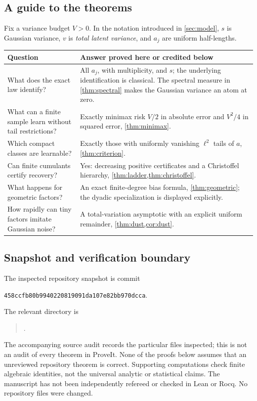 \documentclass[11pt,letterpaper]{article}
\numberwithin{equation}{section}
\theoremstyle{definition}
\theoremstyle{remark}
\newcommand{\pin}{458ccfb80b9940220819091da107e82bb970dcca}
\begin{document}
\subsection{A guide to the theorems}
Fix a variance budget $V>0$. In the notation introduced in \cref{sec:model},
$s$ is Gaussian variance, $v$ is \emph{total latent variance}, and $a_j$ are
uniform half-lengths.
\begin{center}
\begin{tabularx}{\textwidth}{@{}p{}X@{}}
\toprule
Question & Answer proved here or credited below \\\midrule
What does the exact law identify? & All $a_j$, with multiplicity, and $s$; the
underlying identification is classical. The spectral measure in
\cref{thm:spectral} makes the Gaussian variance an atom at zero. \\
What can a finite sample learn without tail restrictions? & Exactly minimax
risk $V/2$ in absolute error and $V^2/4$ in squared error,
\cref{thm:minimax}. \\
Which compact classes are learnable? & Exactly those with uniformly vanishing
$\ell^2$ tails of $a$, \cref{thm:criterion}. \\
Can finite cumulants certify recovery? & Yes: decreasing positive certificates
and a Christoffel hierarchy, \cref{thm:ladder,thm:christoffel}. \\
What happens for geometric factors? & An exact finite-degree bias formula,
\cref{thm:geometric}; the dyadic specialization is displayed explicitly. \\
How rapidly can tiny factors imitate Gaussian noise? & A total-variation
asymptotic with an explicit uniform remainder, \cref{thm:dust,cor:dust}. \\
\bottomrule
\end{tabularx}
\end{center}

\subsection{Snapshot and verification boundary}
The inspected repository snapshot is commit
\begin{center}\small\texttt{\pin}.\end{center}
The relevant directory is
\begin{quote}\small{}.\end{quote}
The accompanying source audit records the particular files inspected; this is
not an audit of every theorem in ProveIt. None of the proofs below assumes
that an unreviewed repository theorem is correct. Supporting computations
check finite algebraic identities, not the universal analytic or statistical
claims. The manuscript has not been independently refereed or checked in
Lean or Rocq. No repository files were changed.
\end{document}
